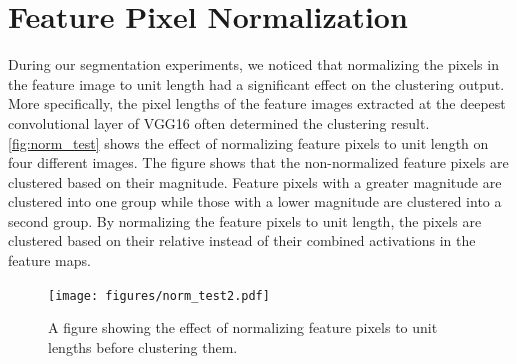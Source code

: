 \section{Feature Pixel Normalization}

During our segmentation experiments, we noticed that normalizing the pixels in the feature image to unit length had a significant effect on the clustering output. More specifically, the pixel lengths of the feature images extracted at the deepest convolutional layer of VGG16 often determined the clustering result. \autoref{fig:norm_test} shows the effect of normalizing feature pixels to unit length on four different images. The figure shows that the non-normalized feature pixels are clustered based on their magnitude. Feature pixels with a greater magnitude are clustered into one group while those with a lower magnitude are clustered into a second group. By normalizing the feature pixels to unit length, the pixels are clustered based on their relative instead of their combined activations in the feature maps.

\begin{figure}[!ht]
    \centering
    \texttt{[image: figures/norm\_test2.pdf]}
    \caption{A figure showing the effect of normalizing feature pixels to unit lengths before clustering them.}
    \label{fig:norm_test}
\end{figure}